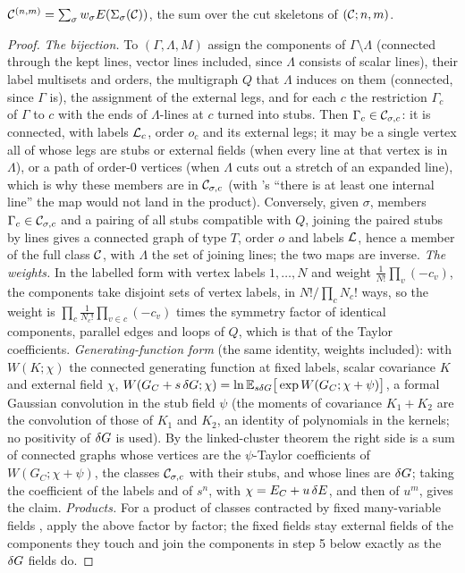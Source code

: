\begin{lemma}\label{lem:a07:R}
$\mathcal C^{(n,m)}=\sum_\sigma w_\sigma E(\Sigma_\sigma(\mathcal C))$, the sum over the cut skeletons of $(\mathcal C;n,m)$.
\end{lemma}
\begin{proof}
\emph{The bijection.} To $(\Gamma,\Lambda,M)$ assign the components of $\Gamma\setminus\Lambda$ (connected through the kept lines, vector lines included, since $\Lambda$ consists of scalar lines), their label multisets and orders, the multigraph $Q$ that $\Lambda$ induces on them (connected, since $\Gamma$ is), the assignment of the external legs, and for each $c$ the restriction $\Gamma_c$ of $\Gamma$ to $c$ with the ends of $\Lambda$-lines at $c$ turned into stubs. Then $\Gamma_c\in\mathcal C_{\sigma,c}$: it is connected, with labels $\mathcal L_c$, order $o_c$ and its external legs; it may be a single vertex all of whose legs are stubs or external fields (when every line at that vertex is in $\Lambda$), or a path of order-$0$ vertices (when $\Lambda$ cuts out a stretch of an expanded line), which is why these members are in $\mathcal C_{\sigma,c}$ (with \cite[p.~415]{Ba3}'s ``there is at least one internal line'' the map would not land in the product). Conversely, given $\sigma$, members $\Gamma_c\in\mathcal C_{\sigma,c}$ and a pairing of all stubs compatible with $Q$, joining the paired stubs by lines gives a connected graph of type $T$, order $o$ and labels $\mathcal L$, hence a member of the full class $\mathcal C$, with $\Lambda$ the set of joining lines; the two maps are inverse. \emph{The weights.} In the labelled form with vertex labels $1,\dots,N$ and weight $\frac1{N!}\prod_v(-c_v)$, the components take disjoint sets of vertex labels, in $N!/\prod_cN_c!$ ways, so the weight is $\prod_c\frac1{N_c!}\prod_{v\in c}(-c_v)$ times the symmetry factor of identical components, parallel edges and loops of $Q$, which is that of the Taylor coefficients. \emph{Generating-function form} (the same identity, weights included): with $W(K;\chi)$ the connected generating function at fixed labels, scalar covariance $K$ and external field $\chi$, $W(G_C+s\,\delta G;\chi)=\ln\mathbb E_{s\delta G}\big[\exp W(G_C;\chi+\psi)\big]$, a formal Gaussian convolution in the stub field $\psi$ (the moments of covariance $K_1+K_2$ are the convolution of those of $K_1$ and $K_2$, an identity of polynomials in the kernels; no positivity of $\delta G$ is used). By the linked-cluster theorem \cite{GJ} the right side is a sum of connected graphs whose vertices are the $\psi$-Taylor coefficients of $W(G_C;\chi+\psi)$, the classes $\mathcal C_{\sigma,c}$ with their stubs, and whose lines are $\delta G$; taking the coefficient of the labels and of $s^n$, with $\chi=E_C+u\,\delta E$, and then of $u^m$, gives the claim. \emph{Products.} For a product of classes contracted by fixed many-variable fields \cite[p.~419]{Ba3}, apply the above factor by factor; the fixed fields stay external fields of the components they touch and join the components in step 5 below exactly as the $\delta G$ fields do.
\end{proof}

